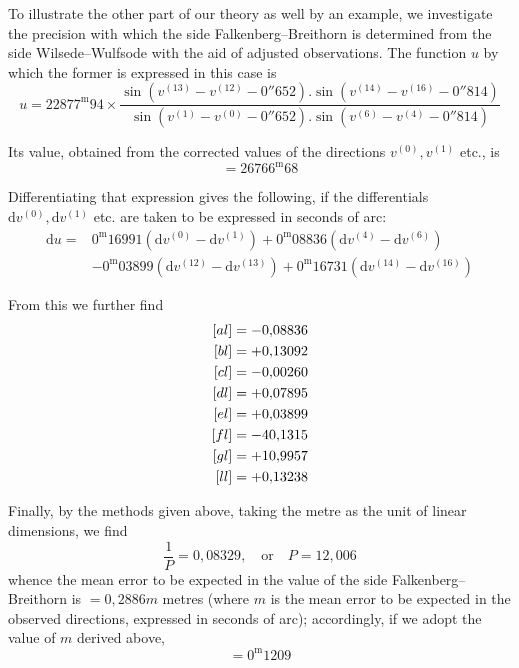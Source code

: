 To illustrate the other part of our theory as well by an example, we investigate the precision with which the side Falkenberg–Breithorn is determined from the side Wilsede–Wulfsode with the aid of adjusted observations. The function \(u\) by which the former is expressed in this case is
\[
u=22877^{\mathrm m}94\times\frac{\sin(v^{(13)}-v^{(12)}-0''652).\sin(v^{(14)}-v^{(16)}-0''814)}{\sin(v^{(1)}-v^{(0)}-0''652).\sin(v^{(6)}-v^{(4)}-0''814)}
\]

Its value, obtained from the corrected values of the directions \(v^{(0)},v^{(1)}\) etc., is
\[
=26766^{\mathrm m}68
\]

Differentiating that expression gives the following, if the differentials \(\mathrm dv^{(0)},\allowbreak\mathrm dv^{(1)}\) etc. are taken to be expressed in seconds of arc:
\[
\begin{aligned}
\mathrm du={}&0^{\mathrm m}16991(\mathrm dv^{(0)}-\mathrm dv^{(1)})+0^{\mathrm m}08836(\mathrm dv^{(4)}-\mathrm dv^{(6)})\\
&-0^{\mathrm m}03899(\mathrm dv^{(12)}-\mathrm dv^{(13)})+0^{\mathrm m}16731(\mathrm dv^{(14)}-\mathrm dv^{(16)})
\end{aligned}
\]

From this we further find
\[
\begin{aligned}\relax
[al]&=-0{,}08836\\
[bl]&=+0{,}13092\\
[cl]&=-0{,}00260\\
[dl]&=+0{,}07895\\
[el]&=+0{,}03899\\
[fl]&=-40{,}1315\\
[gl]&=+10{,}9957\\
[ll]&=+0{,}13238
\end{aligned}
\]

Finally, by the methods given above, taking the metre as the unit of linear dimensions, we find
\[
\frac1P=0{,}08329,\quad\text{or}\quad P=12{,}006
\]
whence the mean error to be expected in the value of the side Falkenberg–Breithorn is \(=0{,}2886m\) metres (where \(m\) is the mean error to be expected in the observed directions, expressed in seconds of arc); accordingly, if we adopt the value of \(m\) derived above,
\[
=0^{\mathrm m}1209
\]

